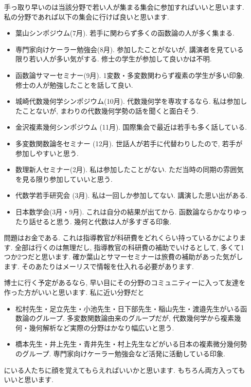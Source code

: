 手っ取り早いのは当該分野で若い人が集まる集会に参加すればいいと思います. 
私の分野であれば以下の集会に行けば良いと思います. 
\begin{itemize}[left=0pt]
  \setlength{\parskip}{0cm} %
  \setlength{\itemsep}{0cm} %
\item 葉山シンポジウム(7月). 若手に関わらず多くの函数論の人が多く集まる.
\item 専門家向けケーラー勉強会(8月). 参加したことがないが, 講演者を見ている限り若い人が多い気がする. 修士の学生が参加して良いかは不明. 
\item 函数論サマーセミナー(9月). 1変数・多変数関わらず複素の学生が多い印象. 修士の人が勉強したことを話して良い.
\item 城崎代数幾何学シンポジウム(10月). 代数幾何学を専攻するなら. 私は参加したことないが, まわりの代数幾何学勢の話を聞くと面白そう.  
\item 金沢複素幾何シンポジウム (11月). 国際集会で最近は若手も多く話している. 
\item 多変数関数論冬セミナー (12月). 世話人が若手に代替わりしたので, 若手が参加しやすいと思う.
\item 数理新人セミナー(2月). 私は参加したことがない. ただ当時の同期の雰囲気を見る限り参加していいと思う. 
\item 代数学若手研究会 (3月). 私は一回しか参加してない. 講演した思い出がある. 
\item 日本数学会(3月・9月). これは自分の結果が出てから. 函数論ならかなりゆったり話せると思う. 幾何と代数は人が多すぎる印象. 
\end{itemize}
問題はお金である. これは指導教官が科研費をどれくらい持っているかによります. 
全部は行くのは無理だし, 指導教官の科研費の補助でいけるとして, 多くて1つか2つだと思います. 
確か葉山とサマーセミナーは旅費の補助があった気がします.
そのあたりはメーリスで情報を仕入れる必要があります. 

博士に行く予定があるなら, 早い目にその分野のコミュニティーに入って友達を作った方がいいと思います. 
私に近い分野だと
\begin{itemize}
  \setlength{\parskip}{0cm} %
  \setlength{\itemsep}{0cm} %
\item 松村先生・足立先生・小池先生・日下部先生・稲山先生・渡邉先生がいる函数論のグループ. 多変数関数論由来のグループだが, 代数幾何学から複素幾何・幾何解析など実際の分野はかなり幅広いと思う. 
\item 橋本先生・井上先生・青井先生・村上先生などがいる日本の複素微分幾何勢のグループ. 専門家向けケーラー勉強会など活発に活動している印象. 
\end{itemize}
にいる人たちに顔を覚えてもらえればいいかと思います.
もちろん両方入ってもいいと思います. 
\vspace{8pt} 


